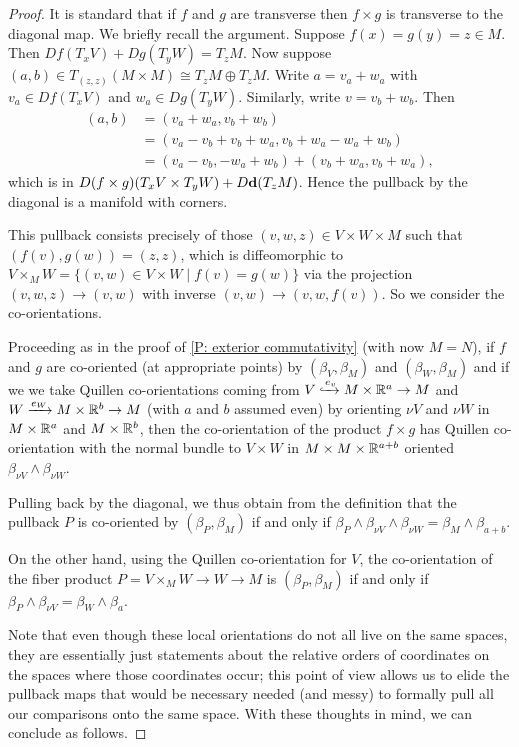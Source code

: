 \begin{proof}
	It is standard that if $f$ and $g$ are transverse then $f \times g$ is transverse to the diagonal map.
	We briefly recall the argument.
	Suppose $f(x) = g(y) = z \in M$.
	Then $Df(T_xV)+Dg(T_yW) = T_zM$.
	Now suppose $(a,b) \in T_{(z,z)}(M \times M) \cong T_zM \oplus T_zM$.
	Write $a = v_a+w_a$ with $v_a \in Df(T_xV)$ and $w_a \in Dg(T_yW)$.
	Similarly, write $v = v_b+w_b$.
	Then
	\begin{align*}
		(a,b)& = (v_a+w_a,v_b+w_b)\\
		& = (v_a-v_b+v_b+w_a, v_b+w_a-w_a+w_b)\\
		& = (v_a-v_b,-w_a+w_b)+(v_b+w_a, v_b+w_a),
	\end{align*}
	which is in $D(f \times g)(T_xV \times T_yW)+D\mathbf{d}(T_zM)$.
	Hence the pullback by the diagonal is a manifold with corners.

	This pullback consists precisely of those $(v,w,z) \in V \times W \times M$ such that $(f(v),g(w)) = (z,z)$, which is diffeomorphic to $V \times_M W = \{(v,w) \in V \times W \mid f(v) = g(w)\}$ via the projection $(v,w,z) \to (v,w)$ with inverse $(v,w) \to (v,w,f(v))$.
	So we consider the co-orientations.

	Proceeding as in the proof of \cref{P: exterior commutativity} (with now $M = N$), if $f$ and $g$ are co-oriented (at appropriate points) by $(\beta_V,\beta_M)$ and $(\beta_W,\beta_M)$ and if we we take Quillen co-orientations coming from $V\xhookrightarrow{e_v} M \times \mathbb{R}^a \to M$ and $W\xrightarrow{e_W} M \times \mathbb{R}^b \to M$ (with $a$ and $b$ assumed even) by orienting $\nu V$ and $\nu W$ in $M \times \mathbb{R}^a$ and $M \times \mathbb{R}^b$, then the co-orientation of the product $f \times g$ has Quillen co-orientation with the normal bundle to $V \times W$ in $M \times M \times \mathbb{R}^{a+b}$ oriented $\beta_{\nu V} \wedge \beta_{\nu W}$.

	Pulling back by the diagonal, we thus obtain from the definition that the pullback $P$ is co-oriented by $(\beta_P,\beta_M)$ if and only if $\beta_P \wedge \beta_{\nu V} \wedge \beta_{\nu W} = \beta_M \wedge \beta_{a+b}$.

	On the other hand, using the Quillen co-orientation for $V$, the co-orientation of the fiber product $P = V \times_M W \to W \to M$ is $(\beta_P,\beta_M)$ if and only if $\beta_P \wedge \beta_{\nu V} = \beta_W \wedge \beta_a$.

	Note that even though these local orientations do not all live on the same spaces, they are essentially just statements about the relative orders of coordinates on the spaces where those coordinates occur; this point of view allows us to elide the pullback maps that would be necessary needed (and messy) to formally pull all our comparisons onto the same space.
	With these thoughts in mind, we can conclude as follows.


\end{proof}
